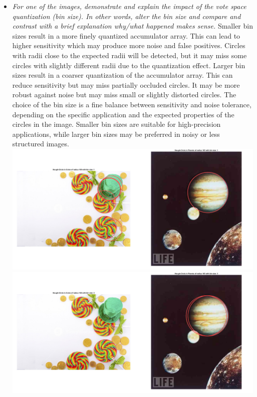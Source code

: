 \documentclass[11pt]{article}
\begin{document}
\begin{itemize}
        \item \textit{For one of the images, demonstrate and explain the impact of the vote space quantization (bin
        size). In other words, alter the bin size and compare and contrast with a brief explanation why/what happened
        makes sense.}\newline
        Smaller bin sizes result in a more finely quantized accumulator array. This can lead to higher sensitivity
        which may produce more noise and false positives. Circles with radii close to the expected radii will be
        detected, but it may miss some circles with slightly different radii due to the quantization effect.
        Larger bin sizes result in a coarser quantization of the accumulator array. This can reduce sensitivity but
        may miss partially occluded circles. It may be more robust against noise but may miss small or slightly
        distorted circles.\newline
        The choice of the bin size is a fine balance between sensitivity and noise tolerance, depending on the specific
        application and the expected properties of the circles in the image.
        Smaller bin sizes are suitable for high-precision applications,
        while larger bin sizes may be preferred in noisy or less structured images.\newline
        \includegraphics[width=\textwidth]{Output Pictures/binsize_1}\newline
        \includegraphics[width=\textwidth]{Output Pictures/binsize_3}\newline


\end{itemize}
\end{document}
